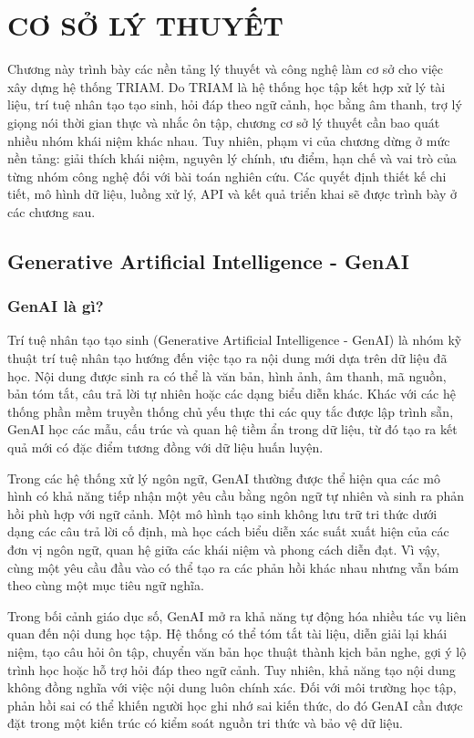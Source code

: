 \documentclass[12pt,a4paper]{report}
\begin{document}
\chapter{CƠ SỞ LÝ THUYẾT}

Chương này trình bày các nền tảng lý thuyết và công nghệ làm cơ sở cho việc xây dựng hệ thống TRIAM. Do TRIAM là hệ thống học tập kết hợp xử lý tài liệu, trí tuệ nhân tạo tạo sinh, hỏi đáp theo ngữ cảnh, học bằng âm thanh, trợ lý giọng nói thời gian thực và nhắc ôn tập, chương cơ sở lý thuyết cần bao quát nhiều nhóm khái niệm khác nhau. Tuy nhiên, phạm vi của chương dừng ở mức nền tảng: giải thích khái niệm, nguyên lý chính, ưu điểm, hạn chế và vai trò của từng nhóm công nghệ đối với bài toán nghiên cứu. Các quyết định thiết kế chi tiết, mô hình dữ liệu, luồng xử lý, API và kết quả triển khai sẽ được trình bày ở các chương sau.

\section{Generative Artificial Intelligence - GenAI}

\subsection{GenAI là gì?}

Trí tuệ nhân tạo tạo sinh (Generative Artificial Intelligence - GenAI) là nhóm kỹ thuật trí tuệ nhân tạo hướng đến việc tạo ra nội dung mới dựa trên dữ liệu đã học. Nội dung được sinh ra có thể là văn bản, hình ảnh, âm thanh, mã nguồn, bản tóm tắt, câu trả lời tự nhiên hoặc các dạng biểu diễn khác. Khác với các hệ thống phần mềm truyền thống chủ yếu thực thi các quy tắc được lập trình sẵn, GenAI học các mẫu, cấu trúc và quan hệ tiềm ẩn trong dữ liệu, từ đó tạo ra kết quả mới có đặc điểm tương đồng với dữ liệu huấn luyện.

Trong các hệ thống xử lý ngôn ngữ, GenAI thường được thể hiện qua các mô hình có khả năng tiếp nhận một yêu cầu bằng ngôn ngữ tự nhiên và sinh ra phản hồi phù hợp với ngữ cảnh. Một mô hình tạo sinh không lưu trữ tri thức dưới dạng các câu trả lời cố định, mà học cách biểu diễn xác suất xuất hiện của các đơn vị ngôn ngữ, quan hệ giữa các khái niệm và phong cách diễn đạt. Vì vậy, cùng một yêu cầu đầu vào có thể tạo ra các phản hồi khác nhau nhưng vẫn bám theo cùng một mục tiêu ngữ nghĩa.

Trong bối cảnh giáo dục số, GenAI mở ra khả năng tự động hóa nhiều tác vụ liên quan đến nội dung học tập. Hệ thống có thể tóm tắt tài liệu, diễn giải lại khái niệm, tạo câu hỏi ôn tập, chuyển văn bản học thuật thành kịch bản nghe, gợi ý lộ trình học hoặc hỗ trợ hỏi đáp theo ngữ cảnh. Tuy nhiên, khả năng tạo nội dung không đồng nghĩa với việc nội dung luôn chính xác. Đối với môi trường học tập, phản hồi sai có thể khiến người học ghi nhớ sai kiến thức, do đó GenAI cần được đặt trong một kiến trúc có kiểm soát nguồn tri thức và bảo vệ dữ liệu.
\end{document}
